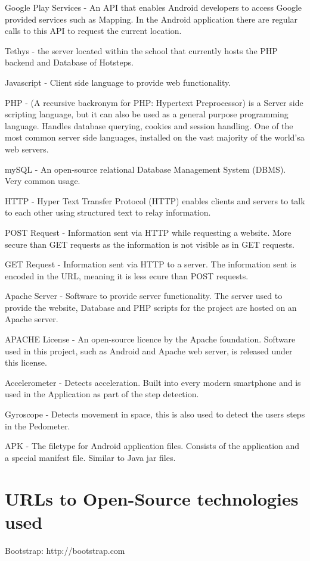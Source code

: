 \documentclass{l4proj}
\begin{document}
Google Play Services - An API that enables Android developers to access Google provided services such as Mapping. In the Android application there are regular calls to this API to request the current location.

Tethys - the server located within the school that currently hosts the PHP backend and Database of Hotsteps.

Javascript - Client side language to provide web functionality.

PHP - (A recursive backronym for PHP: Hypertext Preprocessor) is a Server side scripting language, but it can also be used as a general purpose programming language. Handles database querying, cookies and session handling. One of the most common server side languages, installed on the vast majority of the world'sa web servers.

mySQL - An open-source relational Database Management System (DBMS). Very common usage.

HTTP - Hyper Text Transfer Protocol (HTTP) enables clients and servers to talk to each other using structured text to relay information.

POST Request - Information sent via HTTP while requesting a website. More secure than GET requests as the information is not visible as in GET requests.

GET Request - Information sent via HTTP to a server. The information sent is encoded in the URL, meaning it is less ecure than POST requests.

Apache Server - Software to provide server functionality. The server used to provide the website, Database and PHP scripts for the project are hosted on an Apache server.

APACHE License - An open-source licence by the Apache foundation. Software used in this project, such as Android and Apache web server, is released under this license.

Accelerometer - Detects acceleration. Built into every modern smartphone and is used in the Application as part of the step detection.

Gyroscope - Detects movement in space, this is also used to detect the users steps in the Pedometer.

APK - The filetype for Android application files. Consists of the application and a special manifest file. Similar to Java jar files.

\section{URLs to Open-Source technologies used}

Bootstrap: http://bootstrap.com
\end{document}

